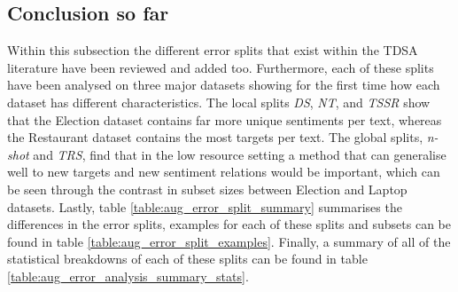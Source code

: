 \begin{figure}[ht!]
    \begin{floatrow}
    \end{floatrow}
\end{figure}

\FloatBarrier
\subsection{Conclusion so far}
Within this subsection the different error splits that exist within the TDSA literature have been reviewed and added too. Furthermore, each of these splits have been analysed on three major datasets showing for the first time how each dataset has different characteristics. The local splits \textit{DS}, \textit{NT}, and \textit{TSSR} show that the Election dataset contains far more unique sentiments per text, whereas the Restaurant dataset contains the most targets per text. The global splits, \textit{n-shot} and \textit{TRS}, find that in the low resource setting a method that can generalise well to new targets and new sentiment relations would be important, which can be seen through the contrast in subset sizes between Election and Laptop datasets. Lastly, table \ref{table:aug_error_split_summary} summarises the differences in the error splits, examples for each of these splits and subsets can be found in table \ref{table:aug_error_split_examples}. Finally, a summary of all of the statistical breakdowns of each of these splits can be found in table \ref{table:aug_error_analysis_summary_stats}.

